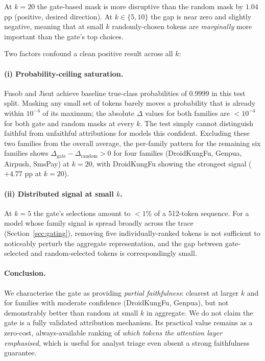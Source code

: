 At $k=20$ the gate-based mask is more disruptive than the random
mask by $1.04$ pp (positive, desired direction). At $k \in \{5, 10\}$
the gap is near zero and slightly negative, meaning that at small
$k$ randomly-chosen tokens are \emph{marginally} more important than
the gate's top choices.

Two factors confound a clean positive result across all $k$:

\paragraph{(i) Probability-ceiling saturation.} Fusob and Jisut
achieve baseline true-class probabilities of $0.9999$ in this test
split. Masking any small set of tokens barely moves a probability
that is already within $10^{-4}$ of its maximum; the absolute
$\Delta$ values for both families are $< 10^{-4}$ for both gate
and random masks at every $k$. The test simply cannot distinguish
faithful from unfaithful attributions for models this confident.
Excluding these two families from the overall average, the
per-family pattern for the remaining six families shows
$\Delta_{\text{gate}} - \Delta_{\text{random}} > 0$ for four
families (DroidKungFu, Genpua, Airpush, SmsPay) at $k = 20$,
with DroidKungFu showing the strongest signal ($+4.77$ pp at $k=20$).

\paragraph{(ii) Distributed signal at small $k$.} At $k = 5$ the
gate's selections amount to $< 1\%$ of a 512-token sequence.
For a model whose family signal is spread broadly across the trace
(Section~\ref{sec:gating}), removing five individually-ranked
tokens is not sufficient to noticeably perturb the aggregate
representation, and the gap between gate-selected and random-selected
tokens is correspondingly small.

\paragraph{Conclusion.} We characterise the gate as providing
\emph{partial faithfulness}: clearest at larger $k$ and for
families with moderate confidence (DroidKungFu, Genpua), but not
demonstrably better than random at small $k$ in aggregate. We do
not claim the gate is a fully validated attribution mechanism.
Its practical value remains as a zero-cost, always-available
ranking of \emph{which tokens the attention layer emphasised},
which is useful for analyst triage even absent a strong
faithfulness guarantee.

